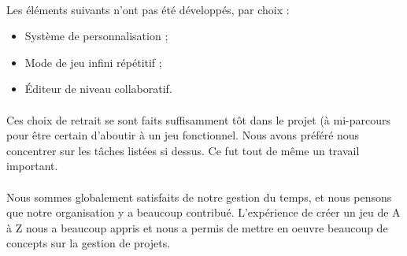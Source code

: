 \paragraph{}
Les éléments suivants n'ont pas été développés, par choix :
\begin{itemize}
\item Système de personnalisation ;
\item Mode de jeu infini répétitif ;
\item Éditeur de niveau collaboratif.
\end{itemize}

\paragraph{}
Ces choix de retrait se sont faits suffisamment tôt dans le projet (à mi-parcours pour être certain d'aboutir à un jeu fonctionnel. Nous avons préféré nous concentrer sur les tâches listées si dessus. Ce fut tout de même un travail important.

\paragraph{}
Nous sommes globalement satisfaits de notre gestion du temps, et nous pensons que notre organisation y a beaucoup contribué.
L'expérience de créer un jeu de A à Z nous a beaucoup appris et nous a permis de mettre en oeuvre beaucoup de concepts sur la gestion de projets.



